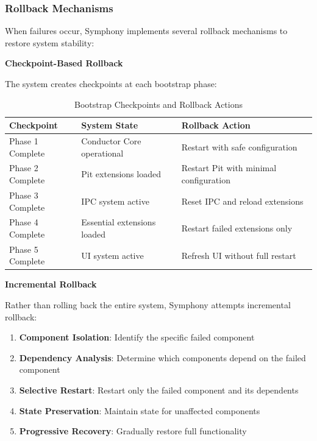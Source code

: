 \subsubsection{Rollback Mechanisms}

When failures occur, Symphony implements several rollback mechanisms to restore system stability:

\textbf{Checkpoint-Based Rollback}

The system creates checkpoints at each bootstrap phase:

\begin{table}[h]
\centering
\caption{Bootstrap Checkpoints and Rollback Actions}
\label{tab:bootstrap-checkpoints}
\begin{tabular}{@{}lll@{}}
\toprule
\textbf{Checkpoint} & \textbf{System State} & \textbf{Rollback Action} \\
\midrule
Phase 1 Complete & Conductor Core operational & Restart with safe configuration \\
Phase 2 Complete & Pit extensions loaded & Restart Pit with minimal configuration \\
Phase 3 Complete & IPC system active & Reset IPC and reload extensions \\
Phase 4 Complete & Essential extensions loaded & Restart failed extensions only \\
Phase 5 Complete & UI system active & Refresh UI without full restart \\
\bottomrule
\end{tabular}
\end{table}

\textbf{Incremental Rollback}

Rather than rolling back the entire system, Symphony attempts incremental rollback:

\begin{enumerate}
    \item \textbf{Component Isolation}: Identify the specific failed component
    \item \textbf{Dependency Analysis}: Determine which components depend on the failed component
    \item \textbf{Selective Restart}: Restart only the failed component and its dependents
    \item \textbf{State Preservation}: Maintain state for unaffected components
    \item \textbf{Progressive Recovery}: Gradually restore full functionality
\end{enumerate}

